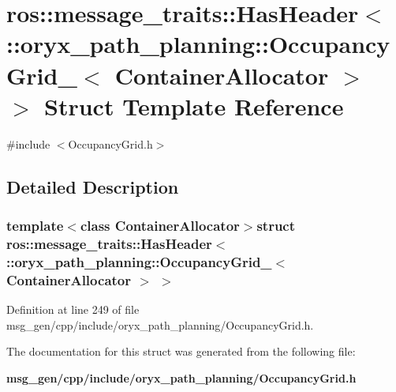 \section{ros\-:\-:message\-\_\-traits\-:\-:\-Has\-Header$<$ \-:\-:oryx\-\_\-path\-\_\-planning\-:\-:\-Occupancy\-Grid\-\_\-$<$ \-Container\-Allocator $>$ $>$ \-Struct \-Template \-Reference}
\label{structros_1_1message__traits_1_1HasHeader_3_01_1_1oryx__path__planning_1_1OccupancyGrid___3_01ContainerAllocator_01_4_01_4}


{\ttfamily \#include $<$\-Occupancy\-Grid.\-h$>$}



\subsection{\-Detailed \-Description}
\subsubsection*{template$<$class Container\-Allocator$>$struct ros\-::message\-\_\-traits\-::\-Has\-Header$<$ \-::oryx\-\_\-path\-\_\-planning\-::\-Occupancy\-Grid\-\_\-$<$ Container\-Allocator $>$ $>$}



\-Definition at line 249 of file msg\-\_\-gen/cpp/include/oryx\-\_\-path\-\_\-planning/\-Occupancy\-Grid.\-h.



\-The documentation for this struct was generated from the following file\-:\begin{DoxyCompactItemize}
\item 
{\bf msg\-\_\-gen/cpp/include/oryx\-\_\-path\-\_\-planning/\-Occupancy\-Grid.\-h}\end{DoxyCompactItemize}
